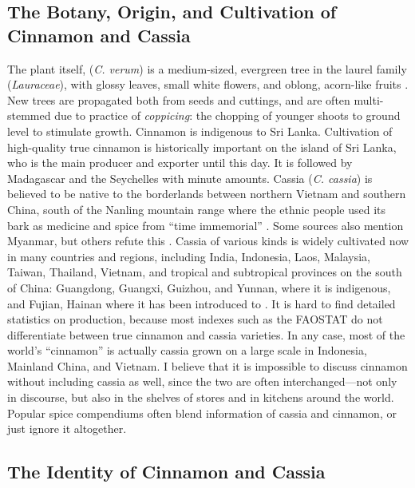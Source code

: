 \subsection{The Botany, Origin, and Cultivation of Cinnamon and Cassia}

The plant itself, (\textit{C. verum}) is a medium-sized, evergreen tree in the laurel family (\textit{Lauraceae}), with glossy leaves, small white flowers, and oblong, acorn-like fruits \autocite[104]{van_wyk_culinary_2014}. New trees are propagated both from seeds and cuttings, and are often multi-stemmed due to practice of \textit{coppicing}: the chopping of younger shoots to ground level to stimulate growth. Cinnamon is indigenous to Sri Lanka. Cultivation of high-quality true cinnamon is historically important on the island of Sri Lanka, who is the main producer and exporter until this day. It is followed by Madagascar and the Seychelles with minute amounts. Cassia (\textit{C. cassia}) is believed to be native to the borderlands between northern Vietnam and southern China, south of the Nanling mountain range where the ethnic people used its bark as medicine and spice from ``time immemorial'' \autocite[400]{hu_food_2005}. Some sources also mention Myanmar, but others refute this \autocite[see][]{haw_cinnamon_2017}. Cassia of various kinds is widely cultivated now in many countries and regions, including India, Indonesia, Laos, Malaysia, Taiwan, Thailand, Vietnam, and tropical and subtropical provinces on the south of China: Guangdong, Guangxi, Guizhou, and Yunnan, where it is indigenous, and Fujian, Hainan where it has been introduced to \autocite{ford_cinnamon_2019, chennault_reclusive_2006}. It is hard to find detailed statistics on production, because most indexes such as the \gls{FAOSTAT} do not differentiate between true cinnamon and cassia varieties. In any case, most of the world's ``cinnamon'' is actually cassia grown on a large scale in Indonesia, Mainland China, and Vietnam. I believe that it is impossible to discuss cinnamon without including cassia as well, since the two are often interchanged---not only in discourse, but also in the shelves of stores and in kitchens around the world. Popular spice compendiums often blend information of cassia and cinnamon, or just ignore it altogether.

\subsection{The Identity of Cinnamon and Cassia}
\label{sec:identity_cinnamon}

